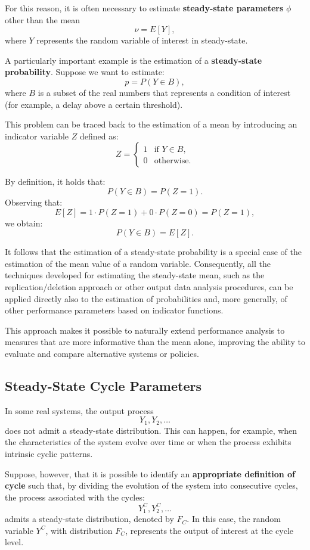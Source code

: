 For this reason, it is often necessary to estimate \textbf{steady-state parameters}
$\phi$ other than the mean
\[
\nu = E[Y],
\]
where $Y$ represents the random variable of interest in steady-state.

A particularly important example is the estimation of a \textbf{steady-state
probability}. Suppose we want to estimate:
\[
p = P(Y \in B),
\]
where $B$ is a subset of the real numbers that represents a condition of
interest (for example, a delay above a certain threshold).

This problem can be traced back to the estimation of a mean by introducing an
indicator variable $Z$ defined as:
\[
Z =
\begin{cases}
1 & \text{if } Y \in B, \\
0 & \text{otherwise}.
\end{cases}
\]

By definition, it holds that:
\[
P(Y \in B) = P(Z = 1).
\]
Observing that:
\[
E[Z] = 1 \cdot P(Z = 1) + 0 \cdot P(Z = 0) = P(Z = 1),
\]
we obtain:
\[
P(Y \in B) = E[Z].
\]

It follows that the estimation of a steady-state probability is a special case
of the estimation of the mean value of a random variable. Consequently, all the
techniques developed for estimating the steady-state mean, such as the
replication/deletion approach or other output data analysis procedures, can
be applied directly also to the estimation of probabilities and, more generally,
of other performance parameters based on indicator functions.

This approach makes it possible to naturally extend performance analysis
to measures that are more informative than the mean alone, improving the ability to
evaluate and compare alternative systems or policies.

\subsection{Steady-State Cycle Parameters}

In some real systems, the output process
\[
Y_1, Y_2, \dots
\]
does not admit a steady-state distribution. This can happen, for example, when
the characteristics of the system evolve over time or when the process exhibits
intrinsic cyclic patterns.

Suppose, however, that it is possible to identify an \textbf{appropriate definition
of cycle} such that, by dividing the evolution of the system into consecutive cycles,
the process associated with the cycles:
\[
Y_1^{C}, Y_2^{C}, \dots
\]
admits a steady-state distribution, denoted by $F_C$. In this case, the
random variable $Y^{C}$, with distribution $F_C$, represents the output of interest
at the cycle level.

